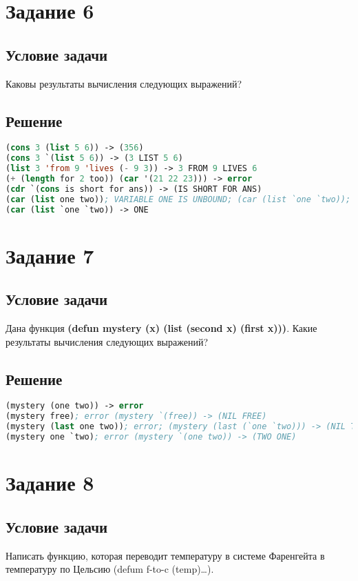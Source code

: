 \section*{Задание 6}
\subsection*{Условие задачи}
Каковы результаты вычисления следующих выражений? 

\subsection*{Решение}

\begin{lstlisting}[label=6xd,caption=Решение задания №6, language=lisp]
(cons 3 (list 5 6)) -> (356)
(cons 3 `(list 5 6)) -> (3 LIST 5 6)
(list 3 'from 9 'lives (- 9 3)) -> 3 FROM 9 LIVES 6
(+ (length for 2 too)) (car '(21 22 23))) -> error
(cdr `(cons is short for ans)) -> (IS SHORT FOR ANS)
(car (list one two)); VARIABLE ONE IS UNBOUND; (car (list `one `two)); -> ONE
(car (list `one `two)) -> ONE
\end{lstlisting}

\section*{Задание 7}
\subsection*{Условие задачи}
Дана функция \textbf{(defun mystery (x) (list (second x) (first x)))}. Какие результаты вычисления следующих выражений?

\subsection*{Решение}

\begin{lstlisting}[label=7xd,caption=Решение задания №7, language=lisp]
(mystery (one two)) -> error
(mystery free); error (mystery `(free)) -> (NIL FREE)
(mystery (last one two)); error; (mystery (last (`one `two))) -> (NIL TWO)
(mystery one `two); error (mystery `(one two)) -> (TWO ONE)
\end{lstlisting}

\section*{Задание 8}
\subsection*{Условие задачи}
Написать функцию, которая переводит температуру в системе Фаренгейта в  
температуру по Цельсию (defum f-to-c (temp)…).  

